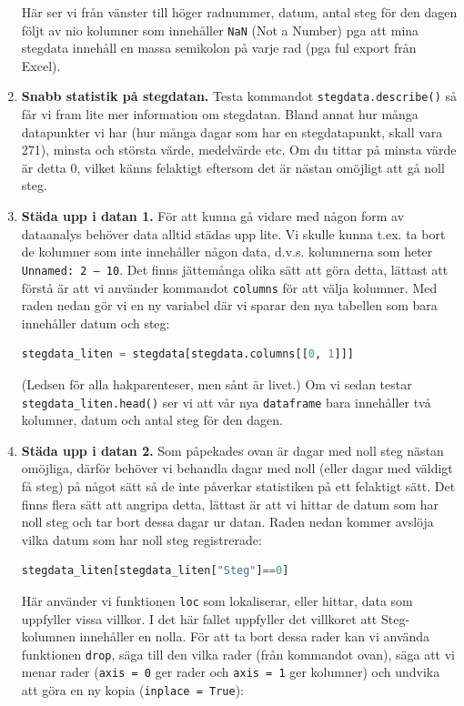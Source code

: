 \documentclass{article}
\begin{document}
\begin{enumerate}
Här ser vi från vänster till höger radnummer, datum, antal steg för den dagen följt av nio kolumner som innehåller \verb+NaN+ (Not a Number) pga att mina stegdata innehåll en massa semikolon på varje rad (pga ful export från Excel).
\item \textbf{Snabb statistik på stegdatan.} Testa kommandot \lstinline[language=Python]{stegdata.describe()}  så får vi fram lite mer information om stegdatan. Bland annat hur många datapunkter vi har (hur många dagar som har en stegdatapunkt, skall vara 271), minsta och största värde, medelvärde etc. Om du tittar på minsta värde är detta 0, vilket känns felaktigt eftersom det är nästan omöjligt att gå noll steg.
\item \textbf{Städa upp i datan 1.} För att kunna gå vidare med någon form av dataanalys behöver data alltid städas upp lite. Vi skulle kunna t.ex. ta bort de kolumner som inte innehåller någon data, d.v.s. kolumnerna som heter \verb+Unnamed: 2 – 10+. Det finns jättemånga olika sätt att göra detta, lättast att förstå är att vi använder kommandot \verb+columns+ för att välja kolumner. Med raden nedan gör vi en ny variabel där vi sparar den nya tabellen som bara innehåller datum och steg:
\begin{lstlisting}[language=Python]
stegdata_liten = stegdata[stegdata.columns[[0, 1]]]
\end{lstlisting}
(Ledsen för alla hakparenteser, men sånt är livet.) Om vi sedan testar \lstinline[language=Python]{stegdata_liten.head()} ser vi att vår nya \verb+dataframe+ bara innehåller två kolumner, datum och antal steg för den dagen. 
\item \textbf{Städa upp i datan 2.} Som påpekades ovan är dagar med noll steg nästan omöjliga, därför behöver vi behandla dagar med noll (eller dagar med väldigt få steg) på något sätt så de inte påverkar statistiken på ett felaktigt sätt. Det finns flera sätt att angripa detta, lättast är att vi hittar de datum som har noll steg och tar bort dessa dagar ur datan. Raden nedan kommer avslöja vilka datum som har noll steg registrerade:
\begin{lstlisting}[language=Python]
stegdata_liten[stegdata_liten["Steg"]==0]
\end{lstlisting}
Här använder vi funktionen \verb+loc+ som lokaliserar, eller hittar, data som uppfyller vissa villkor. I det här fallet uppfyller det villkoret att Steg-kolumnen innehåller en nolla. För att ta bort dessa rader kan vi använda funktionen \verb+drop+, säga till den vilka rader (från kommandot ovan), säga att vi menar rader (\verb+axis = 0+ ger rader och \verb+axis = 1+ ger kolumner) och undvika att göra en ny kopia (\verb+inplace = True+):

\end{enumerate}
\end{document}
